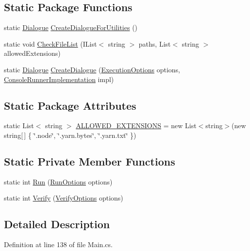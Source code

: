 \subsection*{Static Package Functions}
\begin{DoxyCompactItemize}
\item 
static \hyperlink{a00090}{Dialogue} \hyperlink{a00174_aff69d6e16dddb077f87a616a57cd3c66}{Create\-Dialogue\-For\-Utilities} ()
\item 
static void \hyperlink{a00174_ad77564b25725a771f0fd4da430582e6f}{Check\-File\-List} (I\-List$<$ string $>$ paths, List$<$ string $>$ allowed\-Extensions)
\item 
static \hyperlink{a00090}{Dialogue} \hyperlink{a00174_aab244361a510cee18ad2f636d110e0d5}{Create\-Dialogue} (\hyperlink{a00101}{Execution\-Options} options, \hyperlink{a00055}{Console\-Runner\-Implementation} impl)
\end{DoxyCompactItemize}
\subsection*{Static Package Attributes}
\begin{DoxyCompactItemize}
\item 
static List$<$ string $>$ \hyperlink{a00174_a0979de7ea02c8c0375b8220a12e6575e}{A\-L\-L\-O\-W\-E\-D\-\_\-\-E\-X\-T\-E\-N\-S\-I\-O\-N\-S} = new List$<$string$>$(new string\mbox{[}$\,$\mbox{]} \{ \char`\"{}.node\char`\"{}, \char`\"{}.yarn.\-bytes\char`\"{}, \char`\"{}.yarn.\-txt\char`\"{} \})
\end{DoxyCompactItemize}
\subsection*{Static Private Member Functions}
\begin{DoxyCompactItemize}
\item 
static int \hyperlink{a00174_a1b974c55540795a9e643c2ec055fbd51}{Run} (\hyperlink{a00144}{Run\-Options} options)
\item 
static int \hyperlink{a00174_a029a5624e7cc3a16ae586b64f13049de}{Verify} (\hyperlink{a00171}{Verify\-Options} options)
\end{DoxyCompactItemize}


\subsection{Detailed Description}


Definition at line 138 of file Main.\-cs.



